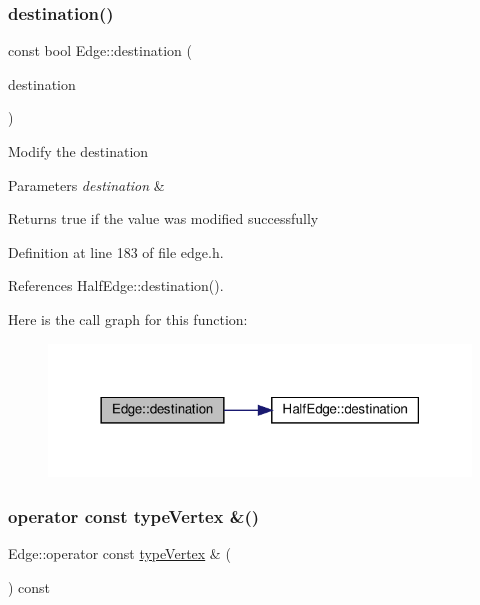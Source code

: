 \subsubsection{\texorpdfstring{destination()}{destination()}\hspace{0.1cm}{\footnotesize\ttfamily [2/2]}}
{\footnotesize\ttfamily const bool Edge\+::destination (\begin{DoxyParamCaption}\item[{const \hyperlink{edge_8h_a5fbd20c46956d479cb10afc9855223f6}{type\+Vertex} \&}]{destination }\end{DoxyParamCaption})\hspace{0.3cm}{\ttfamily [inline]}}

Modify the destination 
\begin{DoxyParams}{Parameters}
{\em destination} & \\
\hline
\end{DoxyParams}
\begin{DoxyReturn}{Returns}
true if the value was modified successfully 
\end{DoxyReturn}


Definition at line 183 of file edge.\+h.



References Half\+Edge\+::destination().

Here is the call graph for this function\+:\nopagebreak
\begin{figure}[H]
\begin{center}
\leavevmode
\includegraphics[width=318pt]{classEdge_a98a9a06f7ed7da370d809fdb1b4c55ce_cgraph}
\end{center}
\end{figure}
\mbox{\label{classEdge_ac7e484c142c7453bed01a18b03053998}} 
\subsubsection{\texorpdfstring{operator const type\+Vertex \&()}{operator const typeVertex \&()}}
{\footnotesize\ttfamily Edge\+::operator const \hyperlink{edge_8h_a5fbd20c46956d479cb10afc9855223f6}{type\+Vertex} \& (\begin{DoxyParamCaption}{ }\end{DoxyParamCaption}) const\hspace{0.3cm}{\ttfamily [inline]}}

